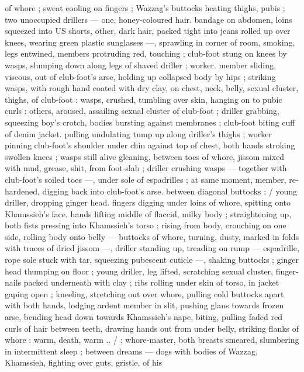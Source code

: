 of whore ; sweat cooling on fingers ; Wazzag's buttocks heating 
thighs, pubis ; two unoccupied drillers --- one, honey-coloured hair. 
bandage on abdomen, loins squeezed into US shorts, other, dark 
hair, packed tight into jeans rolled up over knees, wearing green 
plastic sunglasses ---, sprawling in corner of room, smoking, legs 
entwined, members protruding red, touching ; club-foot stung on 
knees by wasps, slumping down along legs of shaved driller ; worker. 
member sliding, viscous, out of club-foot's arse, holding up 
collapsed body by hips ; striking wasps, with rough hand coated with 
dry clay, on chest, neck, belly, sexual cluster, thighs, of club-foot : 
wasps, crushed, tumbling over skin, hanging on to pubic curls : 
others, aroused, assailing sexual cluster of club-foot ; driller 
grabbing, squeezing boy's crotch, bodies bursting against 
membranes ; club-foot biting cuff of denim jacket. pulling undulating 
tump up along driller's thighs ; worker pinning club-foot's shoulder 
under chin against top of chest, both hands stroking swollen knees 
; wasps still alive gleaning, between toes of whore, jissom mixed with 
mud, grease, shit, from foot-slab ; driller crushing wasps --- together 
with club-foot's soiled toes ---, under sole of espadrilles ; at same 
moment, member, re-hardened, digging back into club-foot's arse. 
between diagonal buttocks ; {\slash} young driller, dropping ginger head. 
fingers digging under loins of whore, spitting onto Khamssieh's face. 
hands lifting middle of flaccid, milky body ; straightening up, both 
fists pressing into Khamssieh's torso ; rising from body, crouching on 
one side, rolling body onto belly --- buttocks of whore, turning. 
dusty, marked in folds with traces of dried jissom ---, driller standing 
up, treading on rump --- espadrille, rope sole stuck with tar, 
squeezing pubescent cuticle ---, shaking buttocks ; ginger head 
thumping on floor ; young driller, leg lifted, scratching sexual cluster, 
finger-nails packed underneath with clay ; ribs rolling under skin of 
torso, in jacket gaping open ; kneeling, stretching out over whore, 
pulling cold buttocks apart with both hands, lodging ardent member 
in slit, pushing glans towards frozen arse, bending head down 
towards Khamssieh's nape, biting, pulling faded red curls of hair 
between teeth, drawing hands out from under belly, striking flanks of 
whore : {\gl}{\td} warm, death, warm ..{\gr} {\slash} ; whore-master, both breasts 
smeared, slumbering in intermittent sleep ; between dreams --- dogs 
with bodies of Wazzag, Khamssieh, fighting over guts, gristle, of his 
